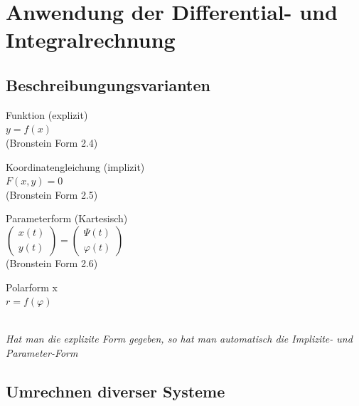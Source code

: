 \section{Anwendung der Differential- und Integralrechnung}

\subsection{Beschreibungungsvarianten}
  \begin{minipage}[t]{3.5cm}
    Funktion (explizit) \\
    $ y = f(x)$ \\
        \tiny{(Bronstein Form 2.4)}
  \end{minipage}
  \begin{minipage}[t]{6cm}    
    Koordinatengleichung (implizit) \\
    $ F(x,y) = 0 $ \\
        \tiny{(Bronstein Form 2.5)}
  \end{minipage}
  \begin{minipage}[t]{5.5cm}    
    Parameterform (Kartesisch)\\
    $ \left( \begin{array} {l} x(t) \\ y(t) \end{array} \right) =
          \left( \begin{array} {l} \Psi(t) \\ \varphi(t) \end{array} \right)$\\
        \tiny{(Bronstein Form 2.6)}
  \end{minipage} 
  \begin{minipage}[t]{3cm}
      Polarform x\\
      $ r=f(\varphi) $ \\
    \end{minipage}\\

  \textit{Hat man die explizite Form gegeben, so hat man automatisch die
  Implizite- und Parameter-Form}

\subsection{Umrechnen diverser Systeme }

